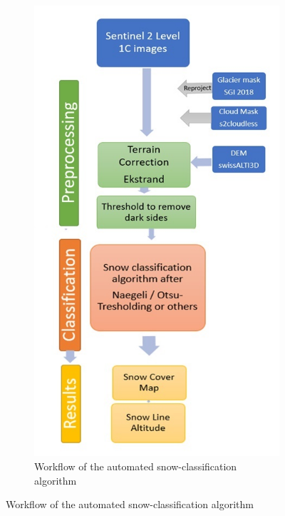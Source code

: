 \documentclass[12pt]{article}
\begin{document}
\begin{figure}[h]
\centering 
  \begin{subfigure}[height=7cm]{0.45\textwidth}
    \includegraphics[width=\textwidth]{workflow}
	\caption{Workflow of the automated snow-classification algorithm}
		\label{fig:workflow}


\end{subfigure}
\end{figure}
\end{document}
